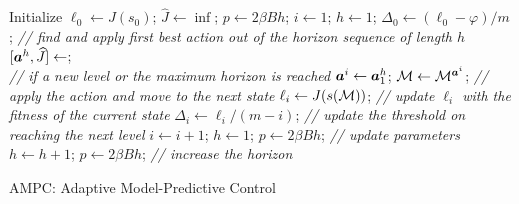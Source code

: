 \begin{algorithm}[t]
    \DontPrintSemicolon
	\BlankLine
	Initialize $\ell_0\leftarrow J(s_0)$; $\widehat{J}\leftarrow\inf$; ${p}\leftarrow 2\beta B h$; $i\leftarrow 1$;  ${h}\leftarrow 1$; $\Delta_0\leftarrow (\ell_0 - \varphi)/m$;
	\BlankLine
	{
     	\textit{// find and apply first best action out of the horizon sequence of length $h$}\;
        $[{\boldsymbol {a}}^{h},\widehat{J}]\leftarrow$;\\

		{
        \textit{// if a new level or the maximum horizon is reached}\;
        	${\boldsymbol {a}}^i\leftarrow {\boldsymbol {a}}^{h}_1$;
            ${\mathcal{M}}\leftarrow{\mathcal{M}}^{{\boldsymbol {a}}^i}$;
            \textit{// apply the action and move to the next state}\;
			$\ell_i\leftarrow J(s({\mathcal{M}}))$; \textit{// update $\ell_i$ with the fitness of the current state}\;
            $\Delta_i\leftarrow \ell_i/(m-i)$; \textit{// update the threshold on reaching the next level}\;
            $i \leftarrow i + 1$;
			${h} \leftarrow 1$;
			${p} \leftarrow 2\beta B h$; \textit{// update parameters}\;
		}
		{
			${h} \leftarrow {h} + 1$;
            $p\leftarrow 2\beta B h$; \textit{// increase the horizon}\;
		}
	}
	\caption{AMPC: Adaptive Model-Predictive Control}
	\label{alg:lerec}
\end{algorithm}
\setlength{\floatsep}{1cm}

